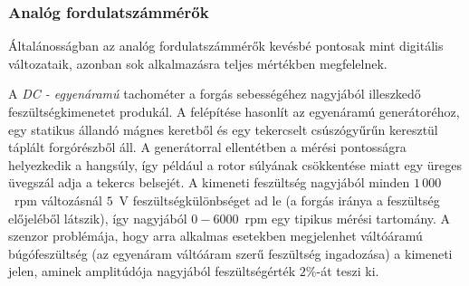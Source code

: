 \subsubsection{Analóg fordulatszámmérők}

Általánosságban az analóg fordulatszámmérők kevésbé pontosak mint digitális változataik, azonban sok alkalmazásra teljes mértékben megfelelnek.

A \textit{DC - egyenáramú} tachométer a forgás sebességéhez nagyjából illeszkedő feszültségkimenetet produkál. A felépítése hasonlít az egyenáramú generátoréhoz, egy statikus állandó mágnes keretből és egy tekercselt csúszógyűrűn keresztül táplált forgórészből áll. A generátorral ellentétben a mérési pontosságra helyezkedik a hangsúly, így például a rotor súlyának csökkentése miatt egy üreges üvegszál adja a tekercs belsejét. A kimeneti feszültség nagyjából minden $1\,000$~rpm változásnál $5$~V feszültségkülönbséget ad le (a forgás iránya a feszültség előjeléből látszik), így nagyjából $0-6000$~rpm egy tipikus mérési tartomány. A szenzor problémája, hogy arra alkalmas esetekben megjelenhet váltóáramú búgófeszültség (az egyenáram váltóáram szerű feszültség ingadozása) a kimeneti jelen, aminek amplitúdója nagyjából feszültségérték $2\%$-át teszi ki.

